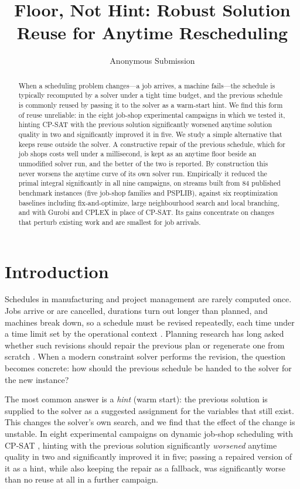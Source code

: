 \documentclass[letterpaper]{article} %
\title{Floor, Not Hint: Robust Solution Reuse for Anytime Rescheduling}
\author{
    Anonymous Submission
}
\begin{document}
\maketitle

\begin{abstract}
When a scheduling problem changes---a job arrives, a machine fails---the schedule is typically recomputed by a solver under a tight time budget, and the previous schedule is commonly reused by passing it to the solver as a warm-start hint. We find this form of reuse unreliable: in the eight job-shop experimental campaigns in which we tested it, hinting CP-SAT with the previous solution significantly worsened anytime solution quality in two and significantly improved it in five. We study a simple alternative that keeps reuse outside the solver. A constructive repair of the previous schedule, which for job shops costs well under a millisecond, is kept as an anytime floor beside an unmodified solver run, and the better of the two is reported. By construction this never worsens the anytime curve of its own solver run. Empirically it reduced the primal integral significantly in all nine campaigns, on streams built from 84 published benchmark instances (five job-shop families and PSPLIB), against six reoptimization baselines including fix-and-optimize, large neighbourhood search and local branching, and with Gurobi and CPLEX in place of CP-SAT. Its gains concentrate on changes that perturb existing work and are smallest for job arrivals.
\end{abstract}

\section{Introduction}

Schedules in manufacturing and project management are rarely computed once. Jobs arrive or are cancelled, durations turn out longer than planned, and machines break down, so a schedule must be revised repeatedly, each time under a time limit set by the operational context \citep{vieira2003,ouelhadj2009}. Planning research has long asked whether such revisions should repair the previous plan or regenerate one from scratch \citep{nebel1995,vanderkrogt2005,fox2006}. When a modern constraint solver performs the revision, the question becomes concrete: how should the previous schedule be handed to the solver for the new instance?

The most common answer is a \emph{hint} (warm start): the previous solution is supplied to the solver as a suggested assignment for the variables that still exist. This changes the solver's own search, and we find that the effect of the change is unstable. In eight experimental campaigns on dynamic job-shop scheduling with CP-SAT \citep{cpsat}, hinting with the previous solution significantly \emph{worsened} anytime quality in two and significantly improved it in five; passing a repaired version of it as a hint, while also keeping the repair as a fallback, was significantly worse than no reuse at all in a further campaign.
\end{document}
